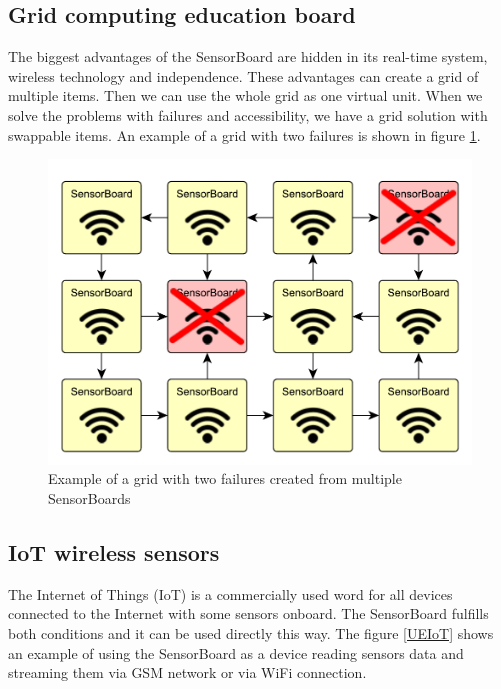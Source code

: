 \subsection{Grid computing education board}
\label{ExampleGrid}
The biggest advantages of the SensorBoard are hidden in its real-time system, wireless technology and independence. These advantages can create a grid of multiple items. Then we can use the whole grid as one virtual unit. When we solve the problems with failures and accessibility, we have a grid solution with swappable items. An example of a grid with two failures is shown in figure \ref{UEgrid}.

\begin{figure}
	\centering
	\label{UEgrid}
	\caption{Example of a grid with two failures created from multiple SensorBoards}
	\includegraphics[width=\linewidth]{img/UsageExamplesGrid.pdf}
\end{figure}

\subsection{\ac{IoT} wireless sensors}
The Internet of Things (\ac{IoT}) is a commercially used word for all devices connected to the Internet with some sensors onboard. The SensorBoard fulfills both conditions and it can be used directly this way. The figure \ref{UEIoT} shows an example of using the SensorBoard as a device reading sensors data and streaming them via GSM network or via WiFi connection.

